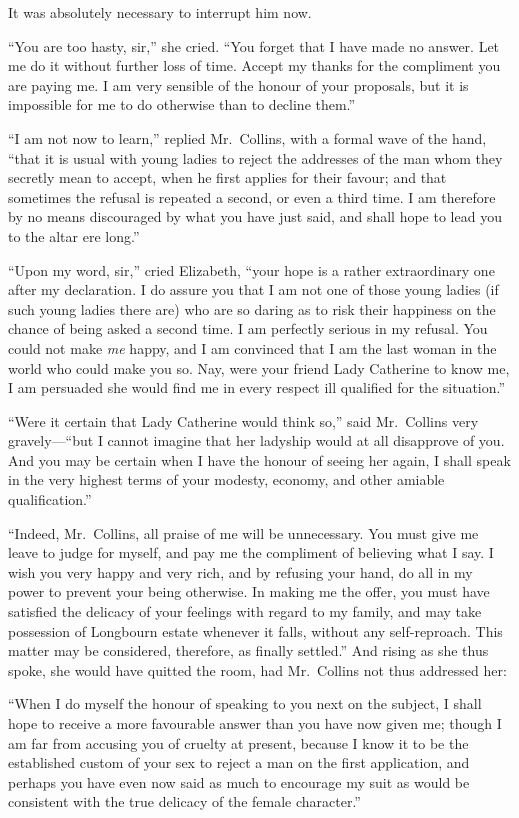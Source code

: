 \documentclass[12pt,english,oneside]{book}
\begin{document}
It was absolutely necessary to interrupt him now.

{}``You are too hasty, sir,'' she cried. {}``You forget that I
have made no answer. Let me do it without further loss of time. Accept
my thanks for the compliment you are paying me. I am very sensible
of the honour of your proposals, but it is impossible for me to do
otherwise than to decline them.''

{}``I am not now to learn,'' replied Mr.\ Collins, with a formal
wave of the hand, {}``that it is usual with young ladies to reject
the addresses of the man whom they secretly mean to accept, when he
first applies for their favour; and that sometimes the refusal is
repeated a second, or even a third time. I am therefore by no means
discouraged by what you have just said, and shall hope to lead you
to the altar ere long.''

{}``Upon my word, sir,'' cried Elizabeth, {}``your hope is a rather
extraordinary one after my declaration. I do assure you that I am
not one of those young ladies (if such young ladies there are) who
are so daring as to risk their happiness on the chance of being asked
a second time. I am perfectly serious in my refusal. You could not
make \textit{me} happy, and I am convinced that I am the last woman
in the world who could make you so. Nay, were your friend Lady Catherine
to know me, I am persuaded she would find me in every respect ill
qualified for the situation.''

{}``Were it certain that Lady Catherine would think so,'' said Mr.\ Collins
very gravely\mbox{---}{}``but I cannot imagine that her ladyship
would at all disapprove of you. And you may be certain when I have
the honour of seeing her again, I shall speak in the very highest
terms of your modesty, economy, and other amiable qualification.''

{}``Indeed, Mr.\ Collins, all praise of me will be unnecessary.
You must give me leave to judge for myself, and pay me the compliment
of believing what I say. I wish you very happy and very rich, and
by refusing your hand, do all in my power to prevent your being otherwise.
In making me the offer, you must have satisfied the delicacy of your
feelings with regard to my family, and may take possession of Longbourn
estate whenever it falls, without any self-reproach. This matter may
be considered, therefore, as finally settled.'' And rising as she
thus spoke, she would have quitted the room, had Mr.\ Collins not
thus addressed her:

{}``When I do myself the honour of speaking to you next on the subject,
I shall hope to receive a more favourable answer than you have now
given me; though I am far from accusing you of cruelty at present,
because I know it to be the established custom of your sex to reject
a man on the first application, and perhaps you have even now said
as much to encourage my suit as would be consistent with the true
delicacy of the female character.''
\end{document}
